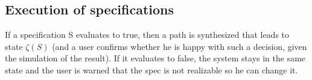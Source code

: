 \documentclass{article}
\begin{document}
\begin{itemize}
\subsection*{Execution of specifications}
If a specification S evaluates to true, then a path is synthesized that leads to state $\zeta(S)$ (and a user confirms whether he is happy with such a decision, given the simulation of the result). If it evaluates to false, the system stays in the same state and the user is warned that the spec is not realizable so he can change it.


\end{itemize}
\end{document}
